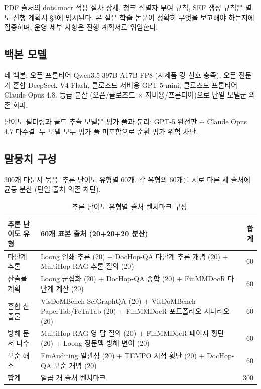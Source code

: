 \documentclass[11pt]{article}
\begin{document}
PDF 출처의 dots.mocr 적용 절차 상세, 청크 식별자 부여 규칙, SEF 생성 규칙은 별도 진행 계획서 \S 3에 명시된다. 본 절은 학술 논문이 정확히 무엇을 보고해야 하는지에 집중하며, 운영 세부 사항은 진행 계획서로 위임한다.

\subsection{백본 모델}

네 백본: 오픈 프론티어 Qwen3.5-397B-A17B-FP8 (시제품 강 신호 충족), 오픈 전문가 혼합 DeepSeek-V4-Flash, 클로즈드 저비용 GPT-5-mini, 클로즈드 프론티어 Claude Opus 4.8. 등급 분산 (오픈/클로즈드 × 저비용/프론티어)으로 단일 모델군 의존 회피.

난이도 필터링과 골드 추출 모델은 평가 풀과 분리: GPT-5 완전판 + Claude Opus 4.7 다수결. 두 모델 모두 평가 풀 미포함으로 순환 평가 위험 차단.

\subsection{말뭉치 구성}

300개 다문서 묶음. 추론 난이도 유형별 60개. 각 유형의 60개를 서로 다른 세 출처에 균등 분산 (단일 출처 의존 차단).

\begin{table}[h]
\centering
\small
\begin{tabular}{lp{8cm}r}
\toprule
추론 난이도 유형 & 60개 표본 출처 (20+20+20 분산) & 합계 \\
\midrule
다단계 추론 & Loong 연쇄 추론 (20) + DocHop-QA 다단계 추론 개념 (20) + MultiHop-RAG 추론 질의 (20) & 60 \\
산출물 계획 & Loong 군집화 (20) + DocHop-QA 종합 (20) + FinMMDocR 다단계 계산 (20) & 60 \\
혼합 산출물 & VisDoMBench SciGraphQA (20) + VisDoMBench PaperTab/FeTaTab (20) + FinMMDocR 포트폴리오 시나리오 (20) & 60 \\
방해 문서 다수 & MultiHop-RAG 영 답 질의 (20) + FinMMDocR 페이지 횡단 (20) + Loong 장문맥 방해 변이 (20) & 60 \\
모순 해소 & FinAuditing 일관성 (20) + TEMPO 시점 횡단 (20) + DocHop-QA 모순 개념 (20) & 60 \\
\midrule
합계 & 일곱 개 출처 벤치마크 & 300 \\
\bottomrule
\end{tabular}
\caption{추론 난이도 유형별 출처 벤치마크 구성.}
\label{tab:corpus}
\end{table}
\end{document}
